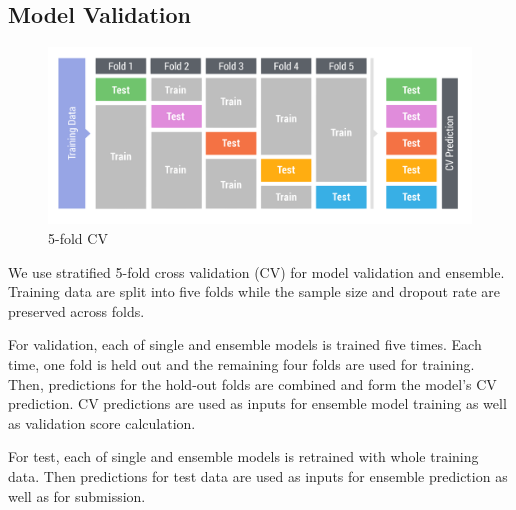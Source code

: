 \subsection{Model Validation}

\begin{figure}[!ht]
  \caption{5-fold CV}
  \centering
    \includegraphics[width=0.5 \textwidth]{cv}
\end{figure}


We use stratified 5-fold cross validation (CV) for model validation and ensemble.
Training data are split into five folds while the sample size and dropout rate are preserved across folds.

For validation, each of single and ensemble models is trained five times. Each time, one fold is held out and the remaining four folds are used for training. Then, predictions for the hold-out folds are combined and form the model's CV prediction. CV predictions are used as inputs for ensemble model training as well as validation score calculation.

For test, each of single and ensemble models is retrained with whole training data. Then predictions for test data are used as inputs for ensemble prediction as well as for submission.
